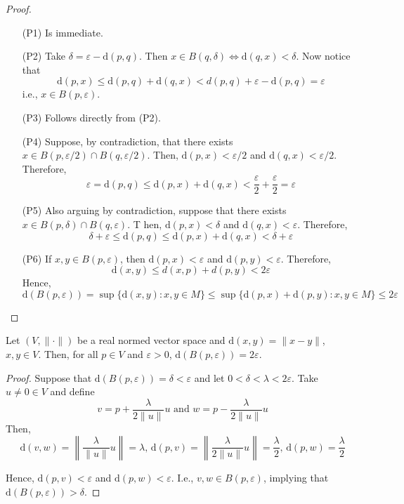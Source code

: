 \begin{proof}
	\begin{itemize}
		\item[(P1)] Is immediate.

		\item[(P2)] Take $\delta = \varepsilon - \mathrm{d}(p,q)$. Then $x \in B(q, \delta) \iff \mathrm{d}(q,x) < \delta$. Now notice that
		\[
			\mathrm{d}(p,x) \leq \mathrm{d}(p,q) + \mathrm{d}(q,x) < d(p,q) + \varepsilon - \mathrm{d}(p,q) = \varepsilon
		\]
		i.e., $x \in B(p, \varepsilon)$.

		\item[(P3)] Follows directly from (P2).
		
		\item[(P4)] Suppose, by contradiction, that there exists $x \in B(p, \varepsilon/2) \cap B(q, \varepsilon/2)$. Then, $\mathrm{d}(p,x) < \varepsilon/2$ and $\mathrm{d}(q,x) < \varepsilon/2$. Therefore, \[ \varepsilon = \mathrm{d}(p,q) \leq \mathrm{d}(p,x) + \mathrm{d}(q,x) < \frac{\varepsilon}{2} + \frac{\varepsilon}{2} = \varepsilon \]
		
		\item[(P5)] Also arguing by contradiction, suppose that there exists $x \in B(p, \delta) \cap B(q, \varepsilon)$. T hen, $\mathrm{d}(p,x) < \delta$ and $\mathrm{d}(q,x) < \varepsilon$. Therefore, \[ \delta + \varepsilon \leq \mathrm{d}(p,q) \leq \mathrm{d}(p,x) + \mathrm{d}(q,x) < \delta + \varepsilon \]
		
		\item[(P6)] If $x,y \in B(p, \varepsilon)$, then $\mathrm{d}(p,x) < \varepsilon$ and $\mathrm{d}(p,y) < \varepsilon$. Therefore, \[ \mathrm{d}(x,y) \leq d(x,p) + d(p,y) < 2 \varepsilon \] Hence,
		\[
			\mathrm{d}(B(p,\varepsilon)) = \sup \{ \mathrm{d}(x,y) : x,y \in M \} \leq \sup \{ \mathrm{d}(p,x) + \mathrm{d}(p,y) : x,y \in M \} \leq 2 \varepsilon
		\]
	\end{itemize}
\end{proof}

\begin{proposition}
	Let $(V, \| \cdot \|)$ be a real normed vector space and $\mathrm{d}(x,y) = \| x - y \|$, $x,y \in V$. Then, for all $p \in V$ and $\varepsilon > 0$, $\mathrm{d}(B(p, \varepsilon)) = 2 \varepsilon$.
\end{proposition}

\begin{proof}
	Suppose that $\mathrm{d}(B(p, \varepsilon)) = \delta < \varepsilon$ and let $0 < \delta < \lambda < 2 \varepsilon$. Take $u \neq 0 \in V$ and define 
	\[
		v = p + \frac{\lambda}{2 \| u \|}u \text{ and } w = p - \frac{\lambda}{2 \| u \|}u
	\]
	Then,
	\[
		\mathrm{d}(v, w) = \left\| \frac{\lambda}{\| u \|} u \right\| = \lambda, \, \mathrm{d}(p,v) = \left\| \frac{\lambda}{2 \| u \|} u \right\| = \frac{\lambda}{2}, \, \mathrm{d}(p,w) = \frac{\lambda}{2}
	\]

	Hence, $\mathrm{d}(p,v) < \varepsilon$ and $\mathrm{d}(p,w) < \varepsilon$. I.e., $v, w \in B(p, \varepsilon)$, implying that $\mathrm{d}(B(p, \varepsilon)) > \delta$.
\end{proof}

